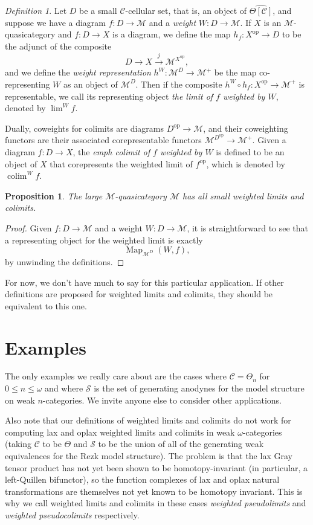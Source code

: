 \documentclass{amsart}
\numberwithin{equation}{section}
\theoremstyle{plain}   %
\newtheorem{prop}[subsection]{Proposition}
\theoremstyle{remark}
\newtheorem{defn}[subsection]{Definition}
\theoremstyle{plain}
\DeclareMathOperator{\colim}{colim}
\DeclareMathOperator{\limw}{lim}
\newcommand{\op}{\ensuremath{\mathrm{op}}}
\DeclareMathOperator{\Map}{Map}
\newcommand{\C}{\ensuremath{\mathcal{C}}}
\newcommand{\M}{\ensuremath{\mathcal{M}}}
\newcommand{\setS}{\ensuremath{\mathscr{S}}}
\newcommand{\cellset}{\ensuremath{\widehat{\Theta[\mathcal{C}]}}}
\begin{document}
\begin{defn}
	Let \(D\) be a small \(\C\)-cellular set, that is, an object of \(\cellset\), and suppose we have a diagram \(f:D\to \M\) and a \emph{weight} \(W:D\to \M\).  If \(X\) is an \(\M\)-quasicategory and \(f:D\to X\) is a diagram, we define the map \(h_f: X^\op \to D\) to be the adjunct of the composite \[D\to X\xrightarrow{j} \M^{X^\op},\] and we define the \emph{weight representation} \(h^W:\M^D \to \M^+\) be the map co-representing \(W\) as an object of \(\M^D\).  Then if the composite \(h^W\circ h_f:X^\op \to \M^+\) is representable, we call its representing object \emph{the limit of \(f\) weighted by \(W\)}, denoted  by \(\limw^W f\).

	Dually, coweights for colimits are diagrams \(D^\op \to \M\), and their coweighting functors are their associated corepresentable functors \(\M^{D^\op}\to \M^+\).  Given a diagram \(f:D\to X\), the \emph{emph colimit of \(f\) weighted by \(W\)} is defined to be an object of \(X\) that corepresents the weighted limit of \(f^\op\), which is denoted by \(\colim^W f\).  
\end{defn}

\begin{prop} The large \(\M\)-quasicategory \(\M\) has all small weighted limits and colimits.
\end{prop}
\begin{proof}  Given \(f:D\to \M\) and a weight \(W:D\to \M\), it is straightforward to see that a representing object for the weighted limit is exactly \[\Map_{\M^D}(W,f),\] by unwinding the definitions.
\end{proof}

For now, we don't have much to say for this particular application.  If other definitions are proposed for weighted limits and colimits, they should be equivalent to this one.  

\section{Examples}
The only examples we really care about are the cases where \(\C=\Theta_n\) for \(0\leq n\leq \omega\) and where \(\setS\) is the set of generating anodynes for the model structure on weak \(n\)-categories.  We invite anyone else to consider other applications.

Also note that our definitions of weighted limits and colimits do not work for computing lax and oplax weighted limits and colimits in weak \(\omega\)-categories (taking \(\C\) to be \(\Theta\) and \(\setS\) to be the union of all of the generating weak equivalences for the Rezk model structure).  The problem is that the lax Gray tensor product has not yet been shown to be homotopy-invariant (in particular, a left-Quillen bifunctor), so the function complexes of lax and oplax natural transformations are themselves not yet known to be homotopy invariant.  This is why we call weighted limits and colimits in these cases \emph{weighted pseudolimits} and \emph{weighted pseudocolimits} respectively.
\end{document}
